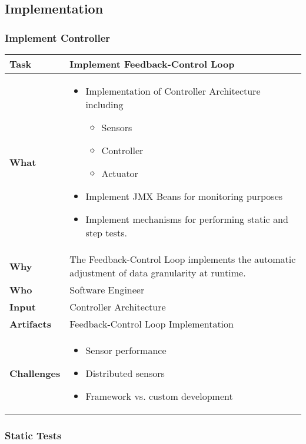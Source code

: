 \subsection{Implementation}

\subsubsection{Implement Controller}

\begin{tabularx}{\textwidth}{@{} l X @{}}
	\caption{Implement Controller / Feedback Loop} \label{table:ch6_Task_Implement_Controller}\\
	\toprule 
	\bfseries Task & Implement Feedback-Control Loop\\
	\midrule 
	\bfseries What & 
	\begin{itemize}
		\item Implementation of Controller Architecture including
		\begin{itemize}
			\item Sensors
			\item Controller
			\item Actuator
		\end{itemize}
		\item Implement JMX Beans for monitoring purposes
		\item Implement mechanisms for performing static and step tests.
	\end{itemize}
	\\
	\midrule 
	\bfseries Why & The Feedback-Control Loop implements the automatic adjustment of data granularity at runtime.\\
	\midrule 
	\bfseries Who & Software Engineer\\
	\midrule 
	\bfseries Input & Controller Architecture\\
	\midrule 
	\bfseries Artifacts & Feedback-Control Loop Implementation\\
	\midrule 
	\bfseries Challenges & 
		\begin{itemize}
			\item Sensor performance
			\item Distributed sensors 
			\item Framework vs. custom development
		\end{itemize}\\
	\bottomrule 
\end{tabularx}


\subsubsection{Static Tests}

